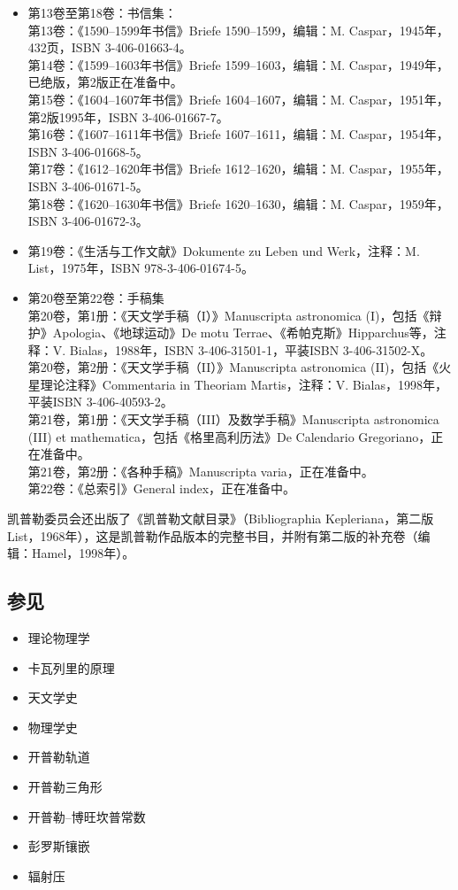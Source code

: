 \begin{itemize}
\item 第13卷至第18卷：书信集：\\
第13卷：《1590–1599年书信》Briefe 1590–1599，编辑：M. Caspar，1945年，432页，ISBN 3-406-01663-4。\\
第14卷：《1599–1603年书信》Briefe 1599–1603，编辑：M. Caspar，1949年，已绝版，第2版正在准备中。\\
第15卷：《1604–1607年书信》Briefe 1604–1607，编辑：M. Caspar，1951年，第2版1995年，ISBN 3-406-01667-7。\\
第16卷：《1607–1611年书信》Briefe 1607–1611，编辑：M. Caspar，1954年，ISBN 3-406-01668-5。\\
第17卷：《1612–1620年书信》Briefe 1612–1620，编辑：M. Caspar，1955年，ISBN 3-406-01671-5。\\
 第18卷：《1620–1630年书信》Briefe 1620–1630，编辑：M. Caspar，1959年，ISBN 3-406-01672-3。\\

\item 第19卷：《生活与工作文献》Dokumente zu Leben und Werk，注释：M. List，1975年，ISBN 978-3-406-01674-5。

\item 第20卷至第22卷：手稿集\\
第20卷，第1册：《天文学手稿（I）》Manuscripta astronomica (I)，包括《辩护》Apologia、《地球运动》De motu Terrae、《希帕克斯》Hipparchus等，注释：V. Bialas，1988年，ISBN 3-406-31501-1，平装ISBN 3-406-31502-X。\\
第20卷，第2册：《天文学手稿（II）》Manuscripta astronomica (II)，包括《火星理论注释》Commentaria in Theoriam Martis，注释：V. Bialas，1998年，平装ISBN 3-406-40593-2。\\
第21卷，第1册：《天文学手稿（III）及数学手稿》Manuscripta astronomica (III) et mathematica，包括《格里高利历法》De Calendario Gregoriano，正在准备中。\\
第21卷，第2册：《各种手稿》Manuscripta varia，正在准备中。\\
第22卷：《总索引》General index，正在准备中。\\
\end{itemize}
凯普勒委员会还出版了《凯普勒文献目录》（Bibliographia Kepleriana，第二版List，1968年），这是凯普勒作品版本的完整书目，并附有第二版的补充卷（编辑：Hamel，1998年）。
\subsection{参见}
\begin{itemize}
\item 理论物理学
\item 卡瓦列里的原理
\item 天文学史
\item 物理学史
\item 开普勒轨道
\item 开普勒三角形
\item 开普勒–博旺坎普常数
\item 彭罗斯镶嵌
\item 辐射压
\end{itemize}